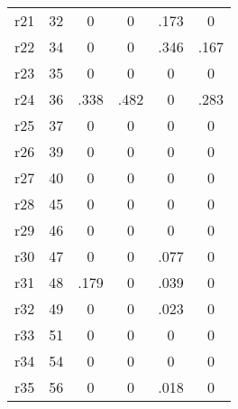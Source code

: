 \begin{table}[htbp]
\begin{tabular}{l*{5}{c}}
r21         &          32&           0&           0&        .173&           0\\
r22         &          34&           0&           0&        .346&        .167\\
r23         &          35&           0&           0&           0&           0\\
r24         &          36&        .338&        .482&           0&        .283\\
r25         &          37&           0&           0&           0&           0\\
r26         &          39&           0&           0&           0&           0\\
r27         &          40&           0&           0&           0&           0\\
r28         &          45&           0&           0&           0&           0\\
r29         &          46&           0&           0&           0&           0\\
r30         &          47&           0&           0&        .077&           0\\
r31         &          48&        .179&           0&        .039&           0\\
r32         &          49&           0&           0&        .023&           0\\
r33         &          51&           0&           0&           0&           0\\
r34         &          54&           0&           0&           0&           0\\
r35         &          56&           0&           0&        .018&           0\\
\bottomrule
\end{tabular}
\end{table}
